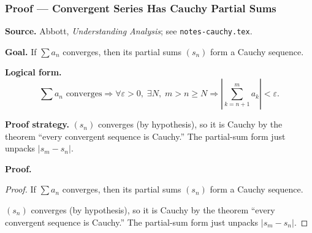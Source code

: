 
\clearpage
{}
\hypertarget{proof-RA-ABB-C-conv-series-cauchy}{}

\subsubsection[Convergent Series Has Cauchy Partial Sums]{Proof --- Convergent Series Has Cauchy Partial Sums}

\bigskip

\noindent
\textbf{Source.}
Abbott, \emph{Understanding Analysis}; see \texttt{notes-cauchy.tex}.

\vspace{0.75em}

\noindent
\textbf{Goal.}
If $\sum a_n$ converges, then its partial sums $(s_n)$ form a Cauchy sequence.

\vspace{0.75em}

\noindent
\textbf{Logical form.}
\[
  \sum a_n \text{ converges} \Rightarrow \forall \varepsilon > 0,\; \exists N,\; m > n \ge N \Rightarrow \left|\sum_{k=n+1}^m a_k\right| < \varepsilon.
\]

\vspace{0.75em}

\noindent
\textbf{Proof strategy.}
$(s_n)$ converges (by hypothesis), so it is Cauchy by the theorem ``every convergent sequence is Cauchy.'' The partial-sum form just unpacks $|s_m - s_n|$.

\vspace{0.75em}

\noindent
\textbf{Proof.}
\begin{proof}
\Claim If $\sum a_n$ converges, then its partial sums $(s_n)$ form a Cauchy sequence.

\Given 

\Goal 

\Strategy $(s_n)$ converges (by hypothesis), so it is Cauchy by the theorem ``every convergent sequence is Cauchy.'' The partial-sum form just unpacks $|s_m - s_n|$.

\medskip


\end{proof}

